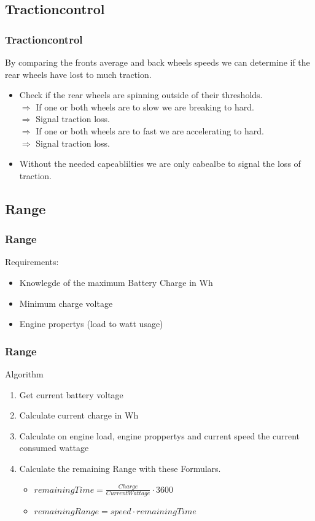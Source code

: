 \documentclass{beamer}
\begin{document}
\subsection{Tractioncontrol}
\begin{frame}
    \frametitle{Tractioncontrol}
    By comparing the fronts average and back wheels speeds we can determine if the rear wheels have lost to much traction.
    \begin{itemize}
     \item Check if the rear wheels are spinning outside of their thresholds.\\
     $\Rightarrow$ If one or both wheels are to slow we are breaking to hard.\\
     $\Rightarrow$ Signal traction loss.\\
     $\Rightarrow$ If one or both wheels are to fast we are accelerating to hard.\\
     $\Rightarrow$ Signal traction loss.
     \pause
     \item Without the needed capeablilties we are only cabealbe to signal the loss of traction.
     \pause
    \end{itemize}
\end{frame}
\subsection{Range}
\begin{frame}
    \frametitle{Range}
    Requirements:
    \begin{itemize}
        \item Knowlegde of the maximum Battery Charge in Wh
        \item Minimum charge voltage
        \item Engine propertys (load to watt usage)
    \end{itemize}
\end{frame}
\begin{frame}
    \frametitle{Range}
    Algorithm
    \begin{enumerate}
     \item Get current battery voltage
     \item Calculate current charge in Wh
     \item Calculate on engine load, engine proppertys and current speed the current consumed wattage
     \item Calculate the remaining Range with these Formulars.
     \begin{itemize}
        \item $remainingTime=\frac{Charge}{Current Wattage}\cdot3600$
        \item $remainingRange=speed\cdot remainingTime$
     \end{itemize}
    \end{enumerate}
\end{frame}
\end{document}
